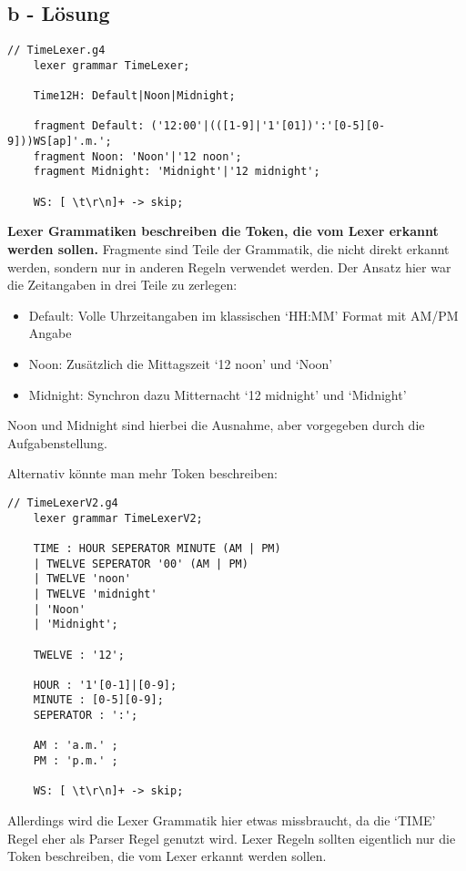 \subsection*{b - Lösung}
\begin{lstlisting}[label={lst:Aufgabe1b}, style=ANTLR]
    // TimeLexer.g4
    lexer grammar TimeLexer;

    Time12H: Default|Noon|Midnight;

    fragment Default: ('12:00'|(([1-9]|'1'[01])':'[0-5][0-9]))WS[ap]'.m.';
    fragment Noon: 'Noon'|'12 noon';
    fragment Midnight: 'Midnight'|'12 midnight';

    WS: [ \t\r\n]+ -> skip;
\end{lstlisting}

\textbf{Lexer Grammatiken beschreiben die Token, die vom Lexer erkannt werden sollen.}
Fragmente sind Teile der Grammatik, die nicht direkt erkannt werden, sondern nur in anderen Regeln verwendet werden. \newline
Der Ansatz hier war die Zeitangaben in drei Teile zu zerlegen: \newline
\begin{itemize}
    \item Default: Volle Uhrzeitangaben im klassischen `HH:MM' Format mit AM/PM Angabe
    \item Noon: Zusätzlich die Mittagszeit `12 noon' und `Noon'
    \item Midnight: Synchron dazu Mitternacht `12 midnight' und `Midnight'
\end{itemize}
Noon und Midnight sind hierbei die Ausnahme, aber vorgegeben durch die Aufgabenstellung. \newline

\newpage

Alternativ könnte man mehr Token beschreiben:
\begin{lstlisting}[label={lst:Aufgabe1bV2}, style=ANTLR]
    // TimeLexerV2.g4
    lexer grammar TimeLexerV2;

    TIME : HOUR SEPERATOR MINUTE (AM | PM)
    | TWELVE SEPERATOR '00' (AM | PM)
    | TWELVE 'noon'
    | TWELVE 'midnight'
    | 'Noon'
    | 'Midnight';

    TWELVE : '12';

    HOUR : '1'[0-1]|[0-9];
    MINUTE : [0-5][0-9];
    SEPERATOR : ':';

    AM : 'a.m.' ;
    PM : 'p.m.' ;

    WS: [ \t\r\n]+ -> skip;
\end{lstlisting}
Allerdings wird die Lexer Grammatik hier etwas missbraucht, da die `TIME' Regel eher als Parser Regel genutzt wird.
Lexer Regeln sollten eigentlich nur die Token beschreiben, die vom Lexer erkannt werden sollen. \newline

\newpage